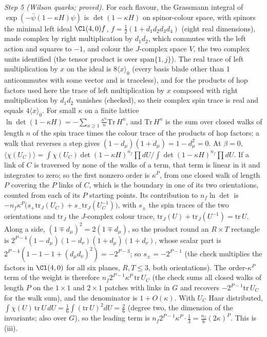 \emph{Step 5 (Wilson quarks; proved).} For each flavour, the Grassmann integral of $\exp(-\bar\psi(1 - \kappa H)\psi)$ is $\det(1 - \kappa H)$ on spinor-colour space, with spinors the minimal left ideal $\Cl(4,0)f$, $f = \tfrac12(1 + d_{1}d_{2}d_{3}d_{4})$ (eight real dimensions), made complex by right multiplication by $d_{1}d_{2}$, which commutes with the left action and squares to $-1$, and colour the $J$-complex space $V$, the two complex units identified (the tensor product is over $\mathrm{span}\{1, j\}$). The real trace of left multiplication by $x$ on the ideal is $8\langle x\rangle_{0}$ (every basis blade other than $1$ anticommutes with some vector and is traceless), and for the products of hop factors used here the trace of left multiplication by $x$ composed with right multiplication by $d_{1}d_{2}$ vanishes (checked), so their complex spin trace is real and equals $4\langle x\rangle_{0}$. For small $\kappa$ on a finite lattice $\ln\det(1 - \kappa H) = -\sum_{n \ge 1}\tfrac{\kappa^{n}}{n}\mathrm{Tr}\,H^{n}$, and $\mathrm{Tr}\,H^{n}$ is the sum over closed walks of length $n$ of the spin trace times the colour trace of the products of hop factors; a walk that reverses a step gives $(1 - d_{\mu})(1 + d_{\mu}) = 1 - d_{\mu}^{2} = 0$. At $\beta = 0$, $\langle\chi(U_{C})\rangle = \int\chi(U_{C})\det(1 - \kappa H)^{n_{f}}\prod dU/\int\det(1 - \kappa H)^{n_{f}}\prod dU$. If a link of $C$ is traversed by none of the walks of a term, that term is linear in it and integrates to zero; so the first nonzero order is $\kappa^{P}$, from one closed walk of length $P$ covering the $P$ links of $C$, which is the boundary in one of its two orientations, counted from each of its $P$ starting points. Its contribution to $n_{f}\ln\det$ is $-n_{f}\kappa^{P}\bigl(s_{+}\mathrm{tr}_{J}(U_{C}) + s_{-}\mathrm{tr}_{J}(U_{C}^{-1})\bigr)$, with $s_{\pm}$ the spin traces of the two orientations and $\mathrm{tr}_{J}$ the $J$-complex colour trace, $\mathrm{tr}_{J}(U) + \mathrm{tr}_{J}(U^{-1}) = \mathrm{tr}\,U$. Along a side, $(1 \mp d_{\mu})^{2} = 2(1 \mp d_{\mu})$, so the product round an $R \times T$ rectangle is $2^{P - 4}(1 - d_{\mu})(1 - d_{\nu})(1 + d_{\mu})(1 + d_{\nu})$, whose scalar part is $2^{P - 4}(1 - 1 - 1 + (d_{\mu}d_{\nu})^{2}) = -2^{P - 3}$; so $s_{\pm} = -2^{P - 1}$ (the check multiplies the factors in $\Cl(4,0)$ for all six planes, $R, T \le 3$, both orientations). The order-$\kappa^{P}$ term of the weight is therefore $n_{f}2^{P - 1}\kappa^{P}\,\mathrm{tr}\,U_{C}$ (the check sums all closed walks of length $P$ on the $1 \times 1$ and $2 \times 1$ patches with links in $G$ and recovers $-2^{P - 1}\mathrm{tr}\,U_{C}$ for the walk sum), and the denominator is $1 + O(\kappa)$. With $U_{C}$ Haar distributed, $\int\chi(U)\,\mathrm{tr}\,U\,dU = \tfrac16\int(\mathrm{tr}\,U)^{2}dU = \tfrac26$ (degree two, the dimension of the invariants; also over $G$), so the leading term is $n_{f}2^{P - 1}\kappa^{P}\cdot\tfrac13 = \tfrac{n_{f}}{6}(2\kappa)^{P}$. This is (iii).

